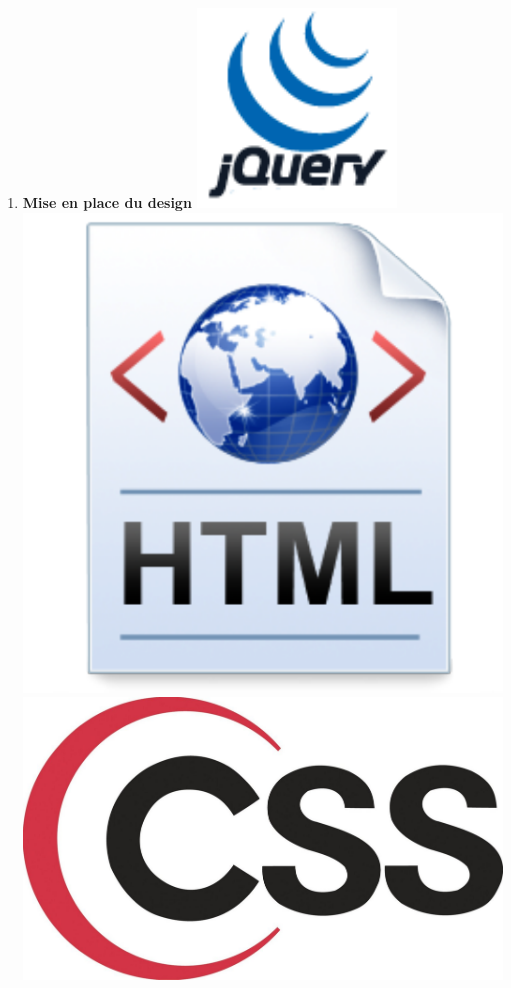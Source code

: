 \documentclass{article}
\begin{document}
\begin{sffamily}
\begin{enumerate}
\item \textbf{Mise en place du design} \includegraphics[scale=0.2]{jquery.pdf} \includegraphics[scale=0.075]{html.pdf} \includegraphics[scale=0.01]{css.pdf}
\end{enumerate}

\end{sffamily}
\end{document}
